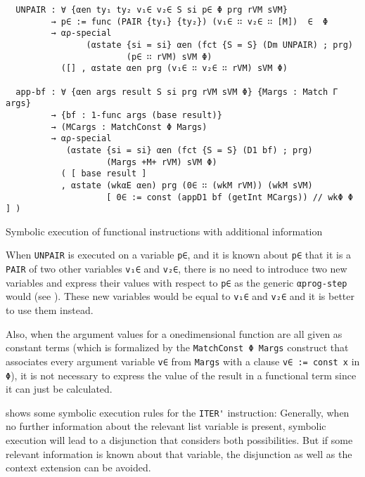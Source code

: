 \begin{listing}[!ht]
\begin{verbatim}
  UNPAIR : ∀ {αen ty₁ ty₂ v₁∈ v₂∈ S si p∈ Φ prg rVM sVM}
         → p∈ := func (PAIR {ty₁} {ty₂}) (v₁∈ ∷ v₂∈ ∷ [M])  ∈  Φ
         → αρ-special 
                (αstate {si = si} αen (fct {S = S} (Dm UNPAIR) ; prg)
                        (p∈ ∷ rVM) sVM Φ)
           ([] , αstate αen prg (v₁∈ ∷ v₂∈ ∷ rVM) sVM Φ)

  app-bf : ∀ {αen args result S si prg rVM sVM Φ} {Margs : Match Γ args}
         → {bf : 1-func args (base result)}
         → (MCargs : MatchConst Φ Margs)
         → αρ-special
            (αstate {si = si} αen (fct {S = S} (D1 bf) ; prg)
                    (Margs +M+ rVM) sVM Φ)
           ( [ base result ]
           , αstate (wkαE αen) prg (0∈ ∷ (wkM rVM)) (wkM sVM) 
                    [ 0∈ := const (appD1 bf (getInt MCargs)) // wkΦ Φ ] )
\end{verbatim}
\caption{Symbolic execution of functional instructions with additional information}
\label{ap-special-func}
\end{listing}

When \verb/UNPAIR/ is executed on a variable \verb/p∈/,
and it is known about \verb/p∈/ that it is a \verb/PAIR/
of two other variables \verb/v₁∈/ and \verb/v₂∈/,
there is no need to introduce two new variables and express their values with respect to \verb/p∈/
as the generic \verb/αprog-step/ would (see ).
These new variables would be equal to \verb/v₁∈/ and \verb/v₂∈/
and it is better to use them instead.

Also, when the argument values for a onedimensional function are all given as constant terms
(which is formalized by the \verb/MatchConst Φ Margs/ construct that associates every argument
variable \verb/v∈/ from \verb/Margs/ with a clause \verb/v∈ := const x/ in \verb/Φ/),
it is not necessary to express the value of the result in a functional term
since it can just be calculated.

 shows some symbolic execution rules for the \verb/ITER'/ instruction:
Generally, when no further information about the relevant list variable is present,
symbolic execution will lead to a disjunction that considers both possibilities.
But if some relevant information is known about that variable,
the disjunction as well as the context extension can be avoided.

